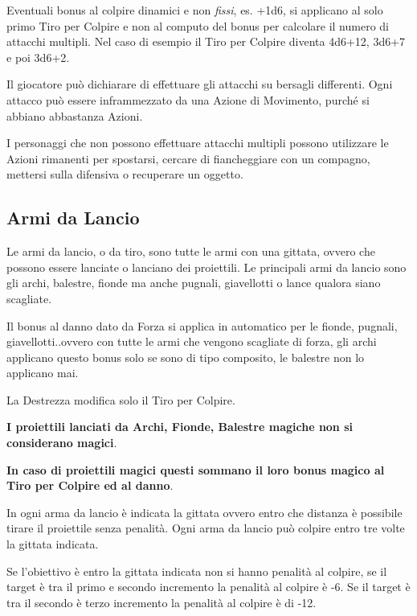 \begin{multicols}{2}
Eventuali bonus al colpire dinamici e non \emph{fissi}, es. +1d6, si applicano al solo primo Tiro per Colpire e non al computo del bonus per calcolare il numero di attacchi multipli. Nel caso di esempio il Tiro per Colpire diventa 4d6+12, 3d6+7 e poi 3d6+2.

Il giocatore può dichiarare di effettuare gli attacchi su bersagli differenti. Ogni attacco può essere inframmezzato da una Azione di Movimento, purché si abbiano abbastanza Azioni.

I personaggi che non possono effettuare attacchi multipli possono utilizzare le Azioni rimanenti per spostarsi, cercare di fiancheggiare con un compagno, mettersi sulla difensiva o recuperare un oggetto.


%

\subsection{Armi da Lancio}\label{armidatiro}

Le armi da lancio, o da tiro, sono tutte le armi con una gittata, ovvero che possono essere lanciate o lanciano dei proiettili. Le principali armi da lancio sono gli archi, balestre, fionde ma anche pugnali, giavellotti o lance qualora siano scagliate.

Il bonus al danno dato da Forza si applica in automatico per le fionde, pugnali, giavellotti..ovvero con tutte le armi che vengono scagliate di forza, gli archi applicano questo bonus solo se sono di tipo composito, le balestre non lo applicano mai.

La Destrezza modifica solo il Tiro per Colpire.

\textbf{I proiettili lanciati da Archi, Fionde, Balestre magiche non si considerano magici}.

\textbf{In caso di proiettili magici questi sommano il loro bonus magico al Tiro per Colpire ed al danno}.

In ogni arma da lancio è indicata la gittata ovvero entro che distanza è possibile tirare il proiettile senza penalità. Ogni arma da lancio può colpire entro tre volte la gittata indicata.

Se l'obiettivo è entro la gittata indicata non si hanno penalità al colpire, se il target è tra il primo e secondo incremento la penalità al colpire è -6. Se il target è tra il secondo è terzo incremento la penalità al colpire è di -12.


\end{multicols}
